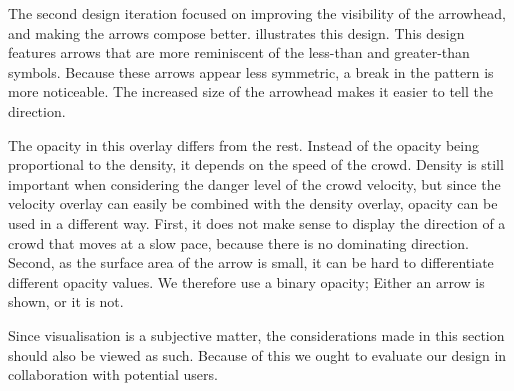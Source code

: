 
The second design iteration focused on improving the visibility of the arrowhead, and making the arrows compose better.  illustrates this design. This design features arrows that are more reminiscent of the less-than and greater-than symbols. Because these arrows appear less symmetric, a break in the pattern is more noticeable. The  increased size of the arrowhead makes it easier to tell the direction.

The opacity in this overlay differs from the rest. Instead of the opacity being proportional to the density, it depends on the speed of the crowd. Density is still important when considering the danger level of the crowd velocity, but since the velocity overlay can easily be combined with the density overlay, opacity can be used in a different way. First, it does not make sense to display the direction of a crowd that moves at a slow pace, because there is no dominating direction. Second, as the surface area of the arrow is small, it can be hard to differentiate different opacity values. We therefore use a binary opacity; Either an arrow is shown, or it is not. 

Since visualisation is a subjective matter, the considerations made in this section should also be viewed as such. Because of this we ought to evaluate our design in collaboration with potential users.
